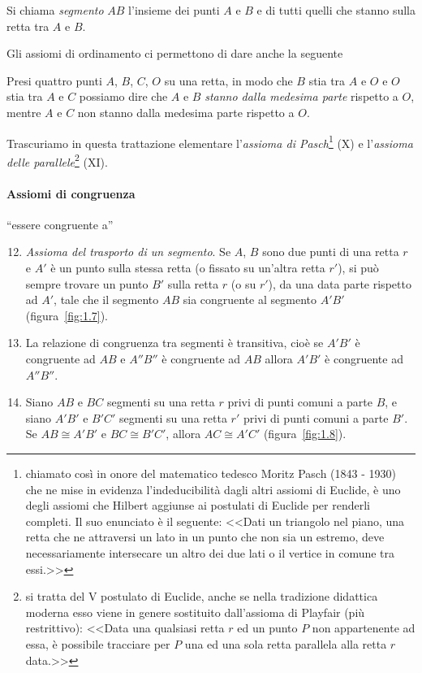 \begin{center}

\end{center}
\begin{definizione}
Si chiama \emph{segmento} $AB$ l'insieme dei punti $A$ e $B$ e di 
tutti quelli che stanno sulla retta tra $A$ e $B$.
\end{definizione}
Gli assiomi di ordinamento ci permettono di dare anche la seguente

\begin{definizione}
Presi quattro punti $A$, $B$, $C$, $O$ su una retta, in modo che $B$ 
stia tra $A$ e $O$ e $O$ stia tra $A$ e $C$ possiamo dire che $A$ e 
$B$ \emph{stanno dalla medesima parte} rispetto a $O$, mentre $A$ e 
$C$ non stanno dalla medesima parte rispetto a $O$.
\end{definizione}
\begin{center}

\end{center}

\osservazione Trascuriamo in questa trattazione elementare 
l'\emph{assioma di Pasch}\footnote{chiamato così in onore del 
matematico tedesco Moritz Pasch (1843 - 1930) che ne mise in evidenza 
l'indeducibilità dagli altri assiomi di Euclide, è uno degli assiomi 
che Hilbert aggiunse ai postulati di Euclide per renderli completi. 
Il suo enunciato è il seguente: <<Dati un triangolo nel piano, una 
retta che ne attraversi un lato in un punto che non sia un estremo, 
deve necessariamente intersecare un altro dei due lati o il vertice 
in comune tra essi.>>} (X) e l'\emph{assioma delle 
parallele}\footnote{si tratta del V postulato di Euclide, anche se 
nella tradizione didattica moderna esso viene in genere sostituito 
dall'assioma di Playfair (più restrittivo): <<Data una qualsiasi 
retta $r$ ed un punto $P$ non appartenente ad essa, è possibile 
tracciare per $P$ una ed una sola retta parallela alla retta $r$ 
data.>>} (XI).

\paragraph{Assiomi di congruenza} ``essere congruente a''
\begin{enumerate}[label=\Roman{*}.]
\setcounter{enumi}{11}
\item \emph{Assioma del trasporto di un segmento}. Se $A$, $B$ sono 
due punti di una retta $r$ e $A'$ è un punto sulla stessa retta (o 
fissato su un'altra retta $r'$), si può sempre trovare un punto $B'$ 
sulla retta $r$ (o su $r'$), da una data parte rispetto ad $A'$, tale 
che il segmento $AB$ sia congruente al segmento $A'B'$ 
(figura~\ref{fig:1.7}).
\item La relazione di congruenza tra segmenti è transitiva, cioè se 
$A'B'$ è congruente ad $AB$ e $A''B''$ è congruente ad $AB$ allora 
$A'B'$ è congruente ad $A''B''$.
\item Siano $AB$ e $BC$ segmenti su una retta $r$ privi di punti 
comuni a parte $B$, e siano $A'B'$ e $B'C'$ segmenti su una retta 
$r'$ privi di punti comuni a parte $B'$. Se $AB\cong A'B'$ e $BC\cong 
B'C'$, allora  $AC\cong A'C'$ (figura~\ref{fig:1.8}).
\end{enumerate}


